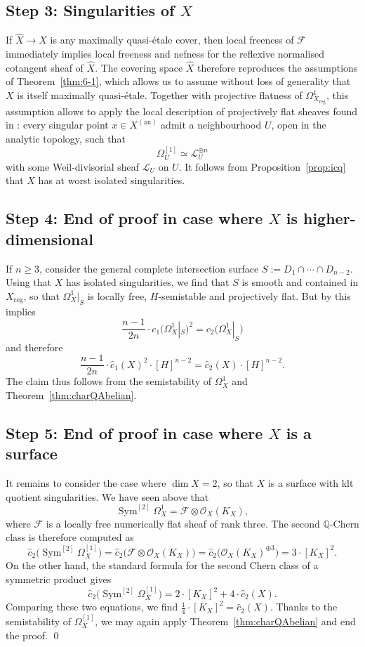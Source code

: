 \documentclass[JEP,XML,SOM,Unicode,published]{cedram}
\let\scr\mathscr
\newcommand{\an}{\mathrm{an}}
\theoremstyle{plain}
\theoremstyle{definition}
\numberwithin{equation}{thm}
\numberwithin{enumi}{thm}
\newcommand{\reg}{\mathrm{reg}}
\DeclareMathOperator{\Sym}{Sym}
\newcommand{\sF}{\scr{F}}
\newcommand{\sL}{\scr{L}}
\newcommand{\sO}{\scr{O}}
\newcommand{\bQ}{\mathbb{Q}}
\let\what\widehat
\begin{document}
\subsection*{Step 3: Singularities of $X$}

If $\what{X} \to X$ is any maximally quasi-étale cover, then local freeness of $\sF$
immediately implies local freeness and nefness for the reflexive normalised
cotangent sheaf of $\what{X}$. The covering space $\what{X}$ therefore
reproduces the assumptions of Theorem~\ref{thm:6-1}, which allows us to assume
without loss of generality that $X$ is itself maximally quasi-étale. Together
with projective flatness of $\Omega^1_{X_{\reg}}$, this assumption allows to apply the
local description of projectively flat sheaves found in
\cite[Prop.\,3.11]{GKP20a}: every singular point $x \in X^{(\an)}$ admit a
neighbourhood $U$, open in the analytic topology, such that
\[
\Omega^{[1]}_U \simeq \sL_U^{\oplus n}
\]
with some Weil-divisorial sheaf $\sL_U$ on $U$. It follows from
Proposition~\ref{prop:icq} that $X$ has at worst isolated singularities.

\subsection*{Step 4: End of proof in case where $X$ is higher-dimensional}

If $n \geq 3$, consider the general complete intersection surface
$S := D_1 \cap\cdots\cap D_{n-2}$. Using that $X$ has isolated singularities, we find
that $S$ is smooth and contained in $X_{\reg}$, so that $\Omega^1_X|_S$ is locally
free, $H$-semistable and projectively flat. But by \cite[Prop.\,3.1.b on
p.\,42]{Kob87} this implies
\[
\frac{n-1}{2n}\cdot c_1\bigl(\Omega^1_X|_S\bigl)^2 = c_2\bigl(\Omega^1_X|_S\bigl)
\]
and therefore
\[
\frac{n-1}{2n}\cdot \what{c}_1(X)^2\cdot [H]^{n-2} = \what{c}_2(X)\cdot [H]^{n-2}.
\]
The claim thus follows from the semistability of $\Omega^1_X$ and
Theorem~\ref{thm:charQAbelian}.

\subsection*{Step 5: End of proof in case where $X$ is a surface}

It remains to consider the case where $\dim X = 2$, so that $X$ is a surface
with klt quotient singularities. We have seen above that
\[
\Sym^{[2]} \Omega^1_X = \sF \otimes \sO_X(K_X),
\]
where $\sF$ is a locally free numerically flat sheaf of rank three. The second
$\bQ$-Chern class is therefore computed as
\[
\what c_2 \bigl(\Sym^{[2]} \Omega^{[1]}_X \bigr) = \what{c}_2 \bigl(\sF \otimes \sO_X(K_X) \bigr) = \what{c}_2 \bigl(\sO_X(K_X)^{\oplus 3} \bigr) = 3\cdot [K_X]^2.
\]
On the other hand, the standard formula for the second Chern class of a symmetric product gives
\[
\what c_2 \bigl(\Sym^{[2]} \Omega^{[1]}_X \bigr) = 2\cdot [K_X]^2 + 4\cdot \what{c}_2(X).
\]
Comparing these two equations, we find $\frac{1}{4}\cdot [K_X]^2 = \what c_2(X)$.
Thanks to the semistability of $\Omega^{[1]}_X$, we may again apply
Theorem~\ref{thm:charQAbelian} and end the proof. \qed

\backmatter


\end{document}
